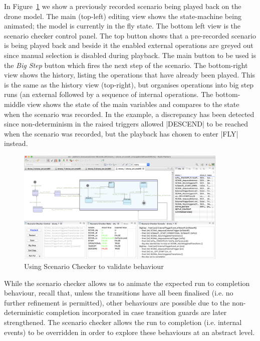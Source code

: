 In Figure~\ref{fig:scenarioChecker} we show a previously recorded scenario being played back on the drone model.
The main (top-left) editing view shows the state-machine being animated; the model is currently in the fly state.
The bottom left view is the scenario checker control panel.
The top button shows that a pre-recorded scenario is being played back and beside it the enabled external operations are greyed out since manual selection is disabled during playback.
The main button to be used is the \emph{Big Step} button which fires the next step of the scenario.
The bottom-right view shows the history, listing the operations that have already been played.
This is the same as the \PROB history view (top-right), but organises operations into big step runs (an external followed by a sequence of internal operations.
The bottom-middle view shows the state of the main variables and compares to the state when the scenario was recorded.
In the example, a discrepancy has been detected since non-determinism in the raised triggers allowed |DESCEND| to be reached when the scenario was recorded, but the playback has chosen to enter |FLY| instead.


\begin{figure}[!h]
	\centering
	\includegraphics[width=0.90\textwidth, trim=30 50 60 0]{figures/scenarioChecker.png}
	\caption{Using Scenario Checker to validate behaviour}
	\label{fig:scenarioChecker}
\end{figure}

While the scenario checker allows us to animate the expected run to completion behaviour, recall that, unless the transitions have all been finalised (i.e. no further refinement is permitted),  other behaviours are possible due to the non-deterministic completion incorporated in case transition guards are later strengthened. 
The scenario checker allows the run to completion (i.e. internal events) to be overridden in order to explore these behaviours at an abstract level.
 

